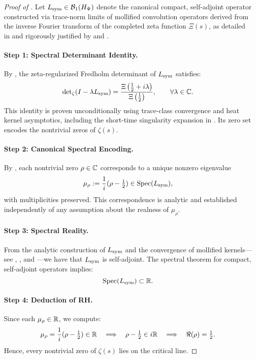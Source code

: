\begin{proof}[Proof of ]
Let \( L_{\mathrm{sym}} \in \mathcal{B}_1(H_{\Psi}) \) denote the canonical compact, self-adjoint operator constructed via trace-norm limits of mollified convolution operators derived from the inverse Fourier transform of the completed zeta function \( \Xi(s) \), as detailed in  and rigorously justified by  and .

\paragraph{Step 1: Spectral Determinant Identity.}
By , the zeta-regularized Fredholm determinant of \( L_{\mathrm{sym}} \) satisfies:
\[
\det\nolimits_{\zeta}(I - \lambda L_{\mathrm{sym}}) = \frac{\Xi\left( \tfrac{1}{2} + i\lambda \right)}{\Xi\left( \tfrac{1}{2} \right)}, \qquad \forall \lambda \in \mathbb{C}.
\]
This identity is proven unconditionally using trace-class convergence and heat kernel asymptotics, including the short-time singularity expansion in . Its zero set encodes the nontrivial zeros of \( \zeta(s) \).

\paragraph{Step 2: Canonical Spectral Encoding.}
By , each nontrivial zero \( \rho \in \mathbb{C} \) corresponds to a unique nonzero eigenvalue
\[
\mu_\rho := \frac{1}{i}(\rho - \tfrac{1}{2}) \in \operatorname{Spec}(L_{\mathrm{sym}}),
\]
with multiplicities preserved. This correspondence is analytic and established independently of any assumption about the realness of \( \mu_\rho \).

\paragraph{Step 3: Spectral Reality.}
From the analytic construction of \( L_{\mathrm{sym}} \) and the convergence of mollified kernels—see , , and —we have that \( L_{\mathrm{sym}} \) is self-adjoint. The spectral theorem for compact, self-adjoint operators implies:
\[
\operatorname{Spec}(L_{\mathrm{sym}}) \subset \mathbb{R}.
\]

\paragraph{Step 4: Deduction of RH.}
Since each \( \mu_\rho \in \mathbb{R} \), we compute:
\[
\mu_\rho = \frac{1}{i}(\rho - \tfrac{1}{2}) \in \mathbb{R} \quad \Longrightarrow \quad \rho - \tfrac{1}{2} \in i\mathbb{R} \quad \Longrightarrow \quad \Re(\rho) = \tfrac{1}{2}.
\]
Hence, every nontrivial zero of \( \zeta(s) \) lies on the critical line.


\end{proof}
